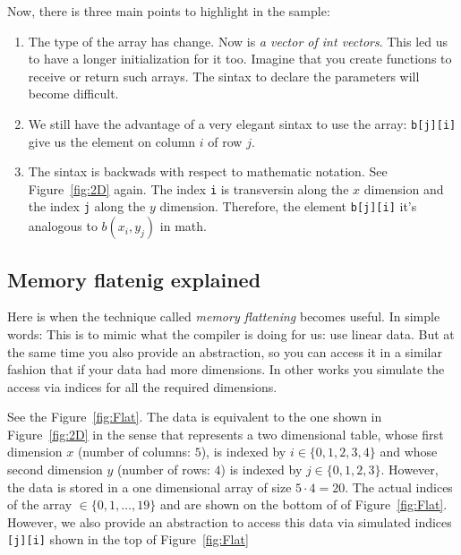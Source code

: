 Now, there is three main points to highlight in the sample:
\begin{enumerate}

\item The type of the array has change.
      Now is \emph{a vector of int vectors}.
      This led us to have a longer initialization for it too.
      Imagine that you create functions to receive or return such arrays.
      The sintax to declare the parameters will become difficult.

\item We still have the advantage of a very elegant sintax to use the array: \texttt{b[j][i]} give us the element on column $i$ of row $j$.

\item The sintax is backwads with respect to mathematic notation.
      See Figure~\ref{fig:2D} again.
      The index \texttt{i} is transversin along the $x$ dimension and the index \texttt{j} along the $y$ dimension.
      Therefore, the element \texttt{b[j][i]} it's analogous to $b(x_i, y_j)$ in math.
 \end{enumerate}

\subsection{Memory flatenig explained}

Here is when the technique called \emph{memory flattening} becomes useful.
In simple words: This is to mimic what the compiler is doing for us: use linear data.
But at the same time you also provide an abstraction, so you can access it in a similar fashion that if your data had more dimensions.
In other works you simulate the access via indices for all the required dimensions.

See the Figure~\ref{fig:Flat}.
The data is equivalent to the one shown in Figure~\ref{fig:2D} in the sense that represents a two dimensional table, whose first dimension $x$ (number of columns: $5$), is indexed by $i \in \{0, 1, 2, 3, 4\}$ and whose second dimension $y$ (number of rows: $4$) is indexed by $j \in \{0, 1, 2, 3\}$.
However, the data is stored in a one dimensional array of size $5 \cdot 4 = 20$.
The actual indices of the array $ \in \{ 0, 1, \ldots, 19 \}$ and are shown on the bottom of of Figure~\ref{fig:Flat}.
However, we also provide an abstraction to access this data via simulated indices \texttt{[j][i]} shown in the top of Figure~\ref{fig:Flat}

